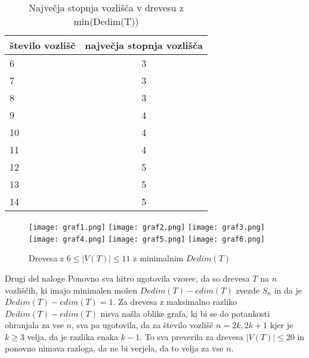 \documentclass[12pt,a4paper]{amsart}
\makeatletter
\renewcommand\subsection{\@startsection{subsection}{2}%
  \z@{.5\linespacing\@plus.7\linespacing}{.5\linespacing}%
  {\normalfont\scshape}}
\theoremstyle{plain} %
\makeatother
\begin{document}
\begin{table}[h]
    \begin{center}
      \begin{tabular}{l|c} %
        \textbf{število vozlišč} & \textbf{največja stopnja vozlišča} \\
        \hline
        6 & 3 \\
        7 & 3 \\
        8 & 3 \\
        9 & 4 \\
        10 & 4 \\
        11 & 4 \\
        12 & 5 \\
        13 & 5 \\
        14 & 5
      \end{tabular}
    \end{center}
    \caption{Največja stopnja vozlišča v drevesu z min(Dedim(T))}
    \label{tab:tabela1}
\end{table}

\bigskip
\begin{figure}[h]
    \centering
    \texttt{[image: graf1.png]}
    \texttt{[image: graf2.png]}
    \texttt{[image: graf3.png]}
    \texttt{[image: graf4.png]}
    \texttt{[image: graf5.png]}
    \texttt{[image: graf6.png]}
    \caption{Drevesa z $6 \leq \left\lvert V(T)\right\rvert \leq 11$ z minimalnim $Dedim(T)$}
    \label{fig:slika1}
\end{figure}

\subsection{Drugi del naloge}
Ponovno sva hitro ugotovila vzorec, da so drevesa  $T$ na $n$ vozliščih, ki imajo minimalen možen $Dedim(T) - edim(T)$ zvezde $S_{n}$ in da je $Dedim(T) - edim(T) = 1$. 
Za drevesa z maksimalno razliko $Dedim(T) - edim(T)$ nisva našla oblike grafa, ki bi se do potankosti ohranjala za vse $n$, sva pa ugotovila, da za 
število vozlišč $n=2k, 2k+1$ kjer je $k\geq 3$ velja, da je razlika enaka $k-1$. To sva preverila za drevesa $\left\lvert V(T)\right\rvert \leq 20$ in ponovno nimava razloga, da ne bi verjela, da to velja za vse $n$.
\end{document}
